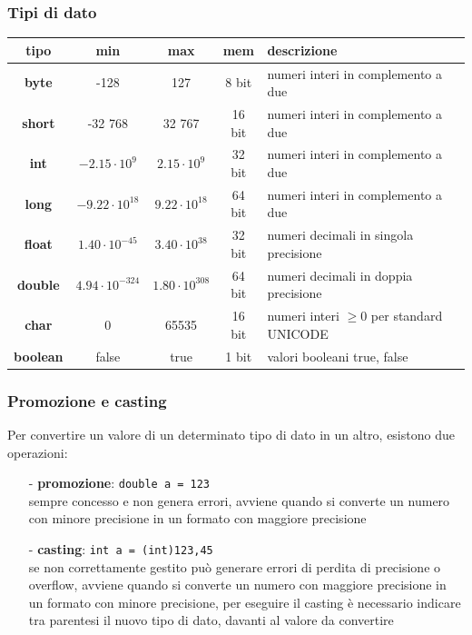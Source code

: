 \documentclass[a4paper]{article}
\begin{document}
\subsubsection*{Tipi di dato}
\begin{center}
	\begin{tabularx}{\textwidth}{c c c c X}
		\textbf{tipo} & \textbf{min} & \textbf{max} & \textbf{mem} & \textbf{descrizione} \\
		\toprule

		\textbf{byte}
		& -128 & 127 & 8 bit & numeri interi in complemento a due \\
		\midrule
		
		\textbf{short}
		& -32 768 & 32 767 & 16 bit & numeri interi in complemento a due \\
		\midrule

		\textbf{int}
		& \(-2.15 \cdot 10^9\) & \(2.15 \cdot 10^9\) & 32 bit & numeri interi in complemento a due \\
		\midrule
		
		\textbf{long}
		& \(-9.22 \cdot 10^{18}\) & \(9.22 \cdot 10^{18}\) & 64 bit & numeri interi in complemento a due \\
		\midrule
		
		\textbf{float}
		& \(1.40 \cdot 10^{-45}\) & \(3.40 \cdot 10^{38}\) & 32 bit & numeri decimali in singola precisione \\
		\midrule
		
		\textbf{double}
		& \(4.94 \cdot 10^{-324}\) & \(1.80 \cdot 10^{308}\) & 64 bit & numeri decimali in doppia precisione \\
		\midrule
		
		\textbf{char}
		& 0 & 65535 & 16 bit & numeri interi \(\geq 0\) per standard UNICODE \\
		\midrule

		\textbf{boolean}
		& false & true & 1 bit & valori booleani true, false
	\end{tabularx}
\end{center}

\subsubsection*{Promozione e casting}
Per convertire un valore di un determinato tipo di dato in un altro, esistono due operazioni:
\begin{itemize}[topsep=3pt, itemsep=0pt]
	\item[-] \textbf{promozione}: \verb|double a = 123| \\
	sempre concesso e non genera errori, avviene quando si converte un numero con minore precisione in un formato con
	maggiore precisione
	\item[-] \textbf{casting}: \verb|int a = (int)123,45| \\
	se non correttamente gestito può generare errori di perdita di precisione o overflow, avviene quando si converte
	un numero con maggiore precisione in un formato con minore precisione, per eseguire il casting è necessario indicare
	tra parentesi il nuovo tipo di dato, davanti al valore da convertire
\end{itemize}
\end{document}
